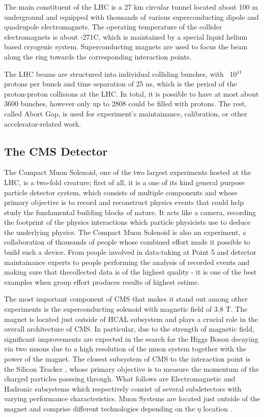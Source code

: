 The main constituent of the LHC is a 27 km circular tunnel located about 100 m underground and equipped with thousands of various superconducting dipole and quadrupole electromagnets. The operating temperature of the collider electromagnets is about -271\textdegree{}C, which is maintained by a special liquid helium based cryogenic system. Superconducting magnets are used to focus the beam along the ring towards the corresponding interaction points.

The LHC beams are structured into individual colliding bunches, with ~10$^{11}$ protons per bunch and time separation of 25 ns, which is the period of the proton-proton collisions at the LHC. In total, it is possible to have at most about 3600 bunches, however only up to 2808 could be filled with protons. The rest, called Abort Gap, is used for experiment's maintainance, calibration, or other accelerator-related work.

\subsection{The CMS Detector} \label{subsection:higgs_cms_generaldescription}
The Compact Muon Solenoid, one of the two largest experiments hosted at the LHC, is a two-fold creature; first of all, it is a one of its kind general purpose particle detector system, which consists of multiple components and whose primary objective is to record and reconstruct physics events that could help study the fundamental building blocks of nature. It acts like a camera, recording the footprint of the physics interactions which particle physicists use to deduce the underlying physics. The Compact Muon Solenoid is also an experiment, a collaboration of thousands of people whose combined effort made it possible to build such a device. From people involved in data-taking at Point 5 and detector maintainance experts to people performing the analysis of recorded events and making sure that thecollected data is of the highest quality - it is one of the best examples when group effort produces results of highest estime.

The most important component of CMS that makes it stand out among other experiments is the superconducting solenoid with magnetic field of 3.8 T. The magnet is located just outside of HCAL subsystem and plays a crucial role in the overall architecture of CMS. In particular, due to the strength of magnetic field, significant improvements are expected in the search for the Higgs Boson decaying via two muons due to a high resolution of the muon system together with the power of the magnet. The closest subsystem of CMS to the interaction point is the Silicon Tracker \cite{Tracker}, whose primary objective is to measure the momentum of the charged particles passsing through. What follows are Electromagnetic \cite{ECAL} and Hadronic \cite{HCAL} subsystems which respectively consist of several subdetectors with varying performance characteristics. Muon Systems are located just outside of the magnet and comprise different technologies depending on the $\eta$ location \cite{Muon}.


